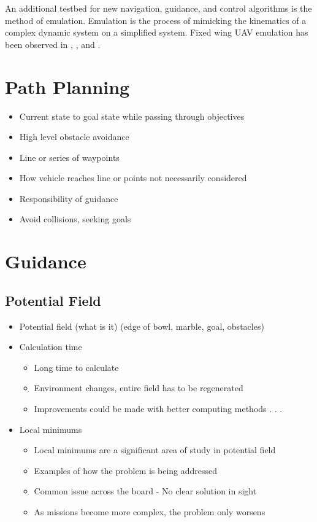 \documentclass[numbered,pdftex]{ohio-etd}
\begin{document}
An additional testbed for new navigation, guidance, and control algorithms is the method of emulation. Emulation is the process of mimicking the kinematics of a complex dynamic system on a simplified system. Fixed wing UAV emulation has been observed in \cite{louali_designing_2014}, \cite{ren_experimental_2007}, and \cite{louali_experimental_2016}.

\section{Path Planning}
\begin{itemize}

\item Current state to goal state while passing through objectives
\item High level obstacle avoidance
\item Line or series of waypoints
\item How vehicle reaches line or points not necessarily considered
\item Responsibility of guidance
\item Avoid collisions, seeking goals
\end{itemize}

\section{Guidance}
\subsection{Potential Field}
\begin{itemize}
\item Potential field (what is it) (edge of bowl, marble, goal, obstacles)
\item Calculation time
\begin{itemize}
\item Long time to calculate
\item Environment changes, entire field has to be regenerated
\item Improvements could be made with better computing methods . . .
\end{itemize}

\item Local minimums
\begin{itemize}
\item Local minimums are a significant area of study in potential field
\item Examples of how the problem is being addressed
\item Common issue across the board - No clear solution in sight
\item As missions become more complex, the problem only worsens
\end{itemize}

\end{itemize}
\end{document}

